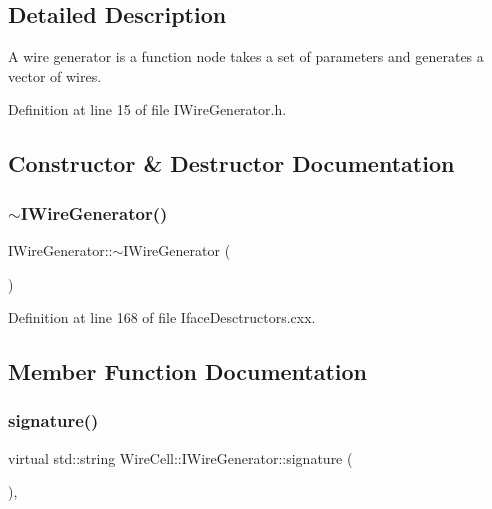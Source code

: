 \subsection{Detailed Description}
A wire generator is a function node takes a set of parameters and generates a vector of wires. 

Definition at line 15 of file I\+Wire\+Generator.\+h.



\subsection{Constructor \& Destructor Documentation}
\mbox{\label{class_wire_cell_1_1_i_wire_generator_affa4ee1e567d1a83a471150885d8d26b}} 
\subsubsection{\texorpdfstring{$\sim$\+I\+Wire\+Generator()}{~IWireGenerator()}}
{\footnotesize\ttfamily I\+Wire\+Generator\+::$\sim$\+I\+Wire\+Generator (\begin{DoxyParamCaption}{ }\end{DoxyParamCaption})\hspace{0.3cm}{\ttfamily [virtual]}}



Definition at line 168 of file Iface\+Desctructors.\+cxx.



\subsection{Member Function Documentation}
\mbox{\label{class_wire_cell_1_1_i_wire_generator_adfafb9936be3d0d4165ca580d48513c6}} 
\subsubsection{\texorpdfstring{signature()}{signature()}}
{\footnotesize\ttfamily virtual std\+::string Wire\+Cell\+::\+I\+Wire\+Generator\+::signature (\begin{DoxyParamCaption}{ }\end{DoxyParamCaption})\hspace{0.3cm}{\ttfamily [inline]}, {\ttfamily [virtual]}}



